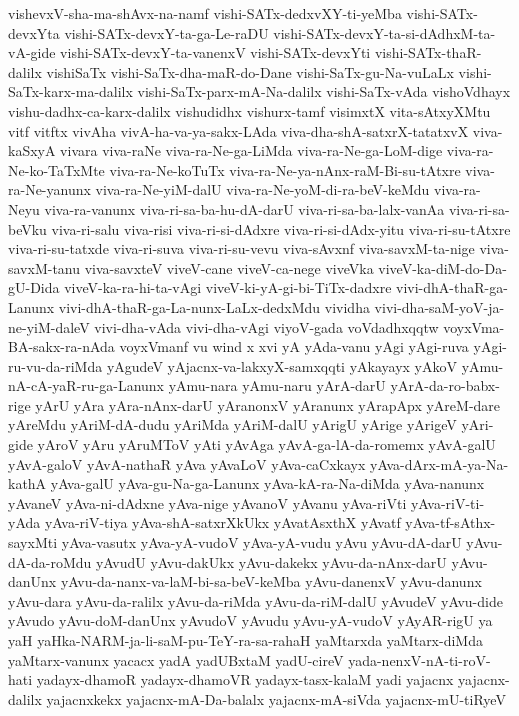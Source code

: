 {vishevxV-sha-ma-shAvx-na-namf
vishi-SATx-dedxvXY-ti-yeMba
vishi-SATx-devxYta
vishi-SATx-devxY-ta-ga-Le-raDU
vishi-SATx-devxY-ta-si-dAdhxM-ta-vA-gide
vishi-SATx-devxY-ta-vanenxV
vishi-SATx-devxYti
vishi-SATx-thaR-dalilx
vishiSaTx
vishi-SaTx-dha-maR-do-Dane
vishi-SaTx-gu-Na-vuLaLx
vishi-SaTx-karx-ma-dalilx
vishi-SaTx-parx-mA-Na-dalilx
vishi-SaTx-vAda
vishoVdhayx
vishu-dadhx-ca-karx-dalilx
vishudidhx
vishurx-tamf
visimxtX
vita-sAtxyXMtu
vitf
vitftx
vivAha
vivA-ha-va-ya-sakx-LAda
viva-dha-shA-satxrX-tatatxvX
viva-kaSxyA
vivara
viva-raNe
viva-ra-Ne-ga-LiMda
viva-ra-Ne-ga-LoM-dige
viva-ra-Ne-ko-TaTxMte
viva-ra-Ne-koTuTx
viva-ra-Ne-ya-nAnx-raM-Bi-su-tAtxre
viva-ra-Ne-yanunx
viva-ra-Ne-yiM-dalU
viva-ra-Ne-yoM-di-ra-beV-keMdu
viva-ra-Neyu
viva-ra-vanunx
viva-ri-sa-ba-hu-dA-darU
viva-ri-sa-ba-lalx-vanAa
viva-ri-sa-beVku
viva-ri-salu
viva-risi
viva-ri-si-dAdxre
viva-ri-si-dAdx-yitu
viva-ri-su-tAtxre
viva-ri-su-tatxde
viva-ri-suva
viva-ri-su-vevu
viva-sAvxnf
viva-savxM-ta-nige
viva-savxM-tanu
viva-savxteV
viveV-cane
viveV-ca-nege
viveVka
viveV-ka-diM-do-Da-gU-Dida
viveV-ka-ra-hi-ta-vAgi
viveV-ki-yA-gi-bi-TiTx-dadxre
vivi-dhA-thaR-ga-Lanunx
vivi-dhA-thaR-ga-La-nunx-LaLx-dedxMdu
vividha
vivi-dha-saM-yoV-ja-ne-yiM-daleV
vivi-dha-vAda
vivi-dha-vAgi
viyoV-gada
voVdadhxqqtw
voyxVma-BA-sakx-ra-nAda
voyxVmanf
vu
wind
x
xvi
yA
yAda-vanu
yAgi
yAgi-ruva
yAgi-ru-vu-da-riMda
yAgudeV
yAjacnx-va-lakxyX-samxqqti
yAkayayx
yAkoV
yAmu-nA-cA-yaR-ru-ga-Lanunx
yAmu-nara
yAmu-naru
yArA-darU
yArA-da-ro-babx-rige
yArU
yAra
yAra-nAnx-darU
yAranonxV
yAranunx
yArapApx
yAreM-dare
yAreMdu
yAriM-dA-dudu
yAriMda
yAriM-dalU
yArigU
yArige
yArigeV
yAri-gide
yAroV
yAru
yAruMToV
yAti
yAvAga
yAvA-ga-lA-da-romemx
yAvA-galU
yAvA-galoV
yAvA-nathaR
yAva
yAvaLoV
yAva-caCxkayx
yAva-dArx-mA-ya-Na-kathA
yAva-galU
yAva-gu-Na-ga-Lanunx
yAva-kA-ra-Na-diMda
yAva-nanunx
yAvaneV
yAva-ni-dAdxne
yAva-nige
yAvanoV
yAvanu
yAva-riVti
yAva-riV-ti-yAda
yAva-riV-tiya
yAva-shA-satxrXkUkx
yAvatAsxthX
yAvatf
yAva-tf-sAthx-sayxMti
yAva-vasutx
yAva-yA-vudoV
yAva-yA-vudu
yAvu
yAvu-dA-darU
yAvu-dA-da-roMdu
yAvudU
yAvu-dakUkx
yAvu-dakekx
yAvu-da-nAnx-darU
yAvu-danUnx
yAvu-da-nanx-va-laM-bi-sa-beV-keMba
yAvu-danenxV
yAvu-danunx
yAvu-dara
yAvu-da-ralilx
yAvu-da-riMda
yAvu-da-riM-dalU
yAvudeV
yAvu-dide
yAvudo
yAvu-doM-danUnx
yAvudoV
yAvudu
yAvu-yA-vudoV
yAyAR-rigU
ya
yaH
yaHka-NARM-ja-li-saM-pu-TeY-ra-sa-rahaH
yaMtarxda
yaMtarx-diMda
yaMtarx-vanunx
yacacx
yadA
yadUBxtaM
yadU-cireV
yada-nenxV-nA-ti-roV-hati
yadayx-dhamoR
yadayx-dhamoVR
yadayx-tasx-kalaM
yadi
yajacnx
yajacnx-dalilx
yajacnxkekx
yajacnx-mA-Da-balalx
yajacnx-mA-siVda
yajacnx-mU-tiRyeV
}
